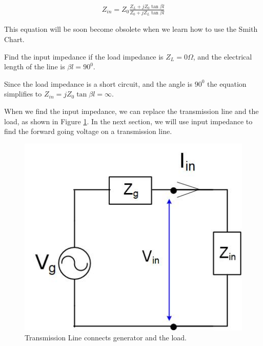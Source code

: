 \documentclass{ximera}
\begin{document}
\begin{eqnarray}
Z_{in}= Z_0 \frac{Z_L+ j Z_0 \tan \beta l}{Z_0+ j Z_L \tan \beta l} 
\end{eqnarray}

This equation will be soon become obsolete when we learn how to use the Smith Chart.

\begin{example}

Find the input impedance if the load impedance is $Z_L=0 \Omega$, and the electrical length of the line is $\beta l = 90^0$.

\begin{explanation}
Since the load impedance is a short circuit, and the angle is $90^0$ the equation simplifies to $Z_{in}=  j Z_0 \tan \beta l = \infty$.
\end{explanation}

\end{example}



When we find the input impedance, we can replace the transmission line and the load, as shown in Figure \ref{fig:IITRLineEqCirc}. In the next section, we will use input impedance to find the forward going voltage on a transmission line.

\begin{figure}[htbp]
\begin{center}
\includegraphics[scale=1]{../jpg/trlineEqCirc.jpg}
\end{center}
\caption{Transmission Line connects generator and the load.}
\label{fig:IITRLineEqCirc}
\end{figure}
\end{document}
